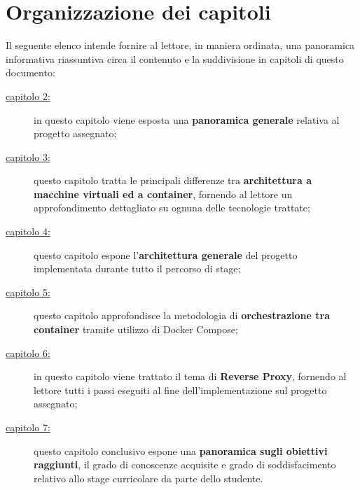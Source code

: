 \section{Organizzazione dei capitoli}
Il seguente elenco intende fornire al lettore, in maniera ordinata, una panoramica informativa riassuntiva circa il contenuto e la suddivisione in capitoli di questo documento:
\begin{description}
    \item[{\hyperref[cap:descrizione-stage]{capitolo 2:}}] in questo capitolo viene esposta una \textbf{panoramica generale} relativa al progetto assegnato;
    
    \item[{\hyperref[cap:container-vm]{capitolo 3:}}] questo capitolo tratta le principali differenze tra \textbf{architettura a macchine virtuali ed a container}, fornendo al lettore un approfondimento dettagliato su ognuna delle tecnologie trattate;
    
    \item[{\hyperref[cap:architettura-progetto-container]{capitolo 4:}}] questo capitolo espone l'\textbf{architettura generale} del progetto implementata durante tutto il percorso di stage;
    
    \item[{\hyperref[cap:orchestrazione-container]{capitolo 5:}}] questo capitolo approfondisce la metodologia di \textbf{orchestrazione tra container} tramite utilizzo di Docker Compose;
    
    \item[{\hyperref[cap:nginx-reverse-proxy]{capitolo 6:}}] in questo capitolo viene trattato il tema di \textbf{Reverse Proxy}, fornendo al lettore tutti i passi eseguiti al fine dell'implementazione sul progetto assegnato;
    
    \item[{\hyperref[cap:conclusioni]{capitolo 7:}}] questo capitolo conclusivo espone una \textbf{panoramica sugli obiettivi raggiunti}, il grado di conoscenze acquisite e grado di soddisfacimento relativo allo stage curricolare da parte dello studente. 
\end{description}